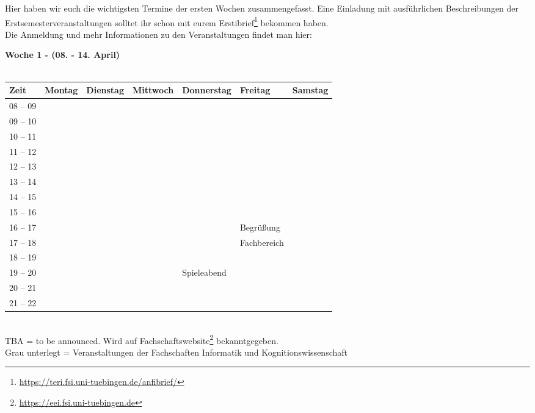 
Hier haben wir euch die wichtigsten Termine der ersten Wochen
zusammengefasst. Eine Einladung mit ausführlichen Beschreibungen der
Erstsemesterveranstaltungen solltet ihr schon mit eurem
Erstibrief\footnote{\url{https://teri.fsi.uni-tuebingen.de/anfibrief/}}
bekommen haben.\\
Die Anmeldung und mehr Informationen zu den Veranstaltungen findet man hier:\\

\newcommand{\event}{\cellcolor{lightlightgray}}


\textbf{Woche 1 - (08. - 14. April)}\\
\\
\begin{tabular}{|l|p{}|p{}|p{}|p{}|p{}|p{}|} \hline
 Zeit & Montag & Dienstag & Mittwoch & Donnerstag & Freitag & Samstag \\ 
 \hline \hline
 08 -- 09 & & & & & &  \\ \cline{1-1} 
 09 -- 10 & & & & & &  \\ \cline{1-1}
 10 -- 11 & & & & & &  \\ \cline{1-1}
 11 -- 12 & & & & & &  \\ \cline{1-1}
 12 -- 13 & & & & & &  \\ \cline{1-1} 
 13 -- 14 & & & & & &  \\ \cline{1-1}
 14 -- 15 & & & & & &  \\ \cline{1-1}
 15 -- 16 & & & & & &  \\ \cline{1-1} \cline{6-6}
 16 -- 17 & & & & &\scriptsize Begrüßung &  \\ \cline{1-1} 
 17 -- 18 & & & & & \scriptsize Fachbereich &  \\ \cline{1-1} \cline{6-6}	
 18 -- 19 & & & & & &   \\ \cline{1-1}
 19 -- 20 & & & &\cellcolor{lightlightgray} \footnotesize{Spieleabend} & \cellcolor{lightlightgray}&   \\ \cline{1-1}
 20 -- 21 & & & &\cellcolor{lightlightgray} & \cellcolor{lightlightgray}&  \\ \cline{1-1}
 21 -- 22 & & & &\cellcolor{lightlightgray} & \cellcolor{lightlightgray}& \\ \hline
 \end{tabular}
\\
{\scriptsize TBA = to be announced. Wird auf Fachschaftswebsite\footnote{\url{https://eei.fsi.uni-tuebingen.de}}  bekanntgegeben.} \\
{\scriptsize Grau unterlegt = Veranstaltungen der Fachschaften Informatik und Kognitionswissenschaft }
\vfill

